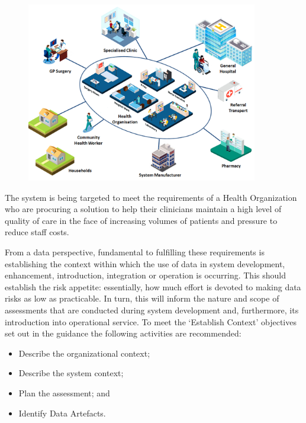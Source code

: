 \begin{figure}[H]
  \centering
  \includegraphics[width=0.9\textwidth]{images/medicalscenario}
  \label{fig:medicalscenario}
\end{figure}

\clearpage
The system is being targeted to meet the requirements of a Health Organization who are procuring a solution to help their clinicians maintain a high level of quality of care in the face of increasing volumes of patients and pressure to reduce staff costs.

From a data perspective, fundamental to fulfilling these requirements is establishing the context within which the use of data in system development, enhancement, introduction, integration or operation is occurring. This should establish the risk appetite: essentially, how much effort is devoted to making data risks as low as practicable. In turn, this will inform the nature and scope of assessments that are conducted during system development and, furthermore, its introduction into operational service. To meet the `Establish Context' objectives set out in the guidance the following activities are recommended:

\begin{itemize}
	\item Describe the organizational context;
	\item Describe the system context;
	\item Plan the assessment; and
	\item Identify \glspl{Data Artefact}.
\end{itemize}


